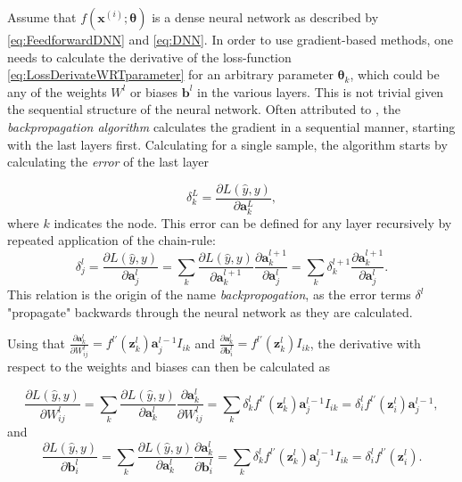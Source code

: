 Assume that $f(\boldsymbol{x}^{(i)}; \boldsymbol{\theta})$ is a dense neural network as described by \cref{eq:FeedforwardDNN} and \cref{eq:DNN}. In order to use gradient-based methods, one needs to calculate the derivative of the loss-function \cref{eq:LossDerivateWRTparameter} for an arbitrary parameter $\boldsymbol{\theta}_k$, which could be any of the weights $W^l$ or biases $\boldsymbol{b}^l$ in the various layers. This is not trivial given the sequential structure of the neural network. Often attributed to \citet{Rumelhart}, the \emph{backpropagation algorithm} calculates the gradient in a sequential manner, starting with the last layers first. Calculating for a single sample, the algorithm starts by calculating the \emph{error} of the last layer


\begin{equation}\label{eq:lastLayerError}
    \delta^L_k = \frac{\partial L(\hat{y}, y)}{\partial \boldsymbol{a}^L_k},
\end{equation}
where $k$ indicates the node. This error can be defined for any layer recursively by repeated application of the chain-rule:
\begin{equation}\label{eq:error}
    \delta^l_j = \frac{\partial L(\hat{y}, y)}{\partial \boldsymbol{a}^l_j} 
    = \sum_k \frac{\partial L(\hat{y}, y)}{\partial \boldsymbol{a}^{l+1}_k} \frac{\partial \boldsymbol{a}^{l+1}_k}{\partial \boldsymbol{a}^{l}_j}
    = \sum_k \delta^{l+1}_k \frac{\partial \boldsymbol{a}^{l+1}_k}{\partial \boldsymbol{a}^{l}_j}.
\end{equation}
This relation is the origin of the name \emph{backpropogation}, as the error terms $\delta^l$ "propagate" backwards through the neural network as they are calculated.

Using that 
$\frac{\partial \boldsymbol{a}^{l}_k}{\partial W^l_{ij}} = f^{l\prime}(\boldsymbol{z}^{l}_k)\boldsymbol{a}^{l-1}_j I_{ik}$ 
and 
$\frac{\partial \boldsymbol{a}^{l}_k}{\partial \boldsymbol{b}^l_{i}} = f^{l\prime}(\boldsymbol{z}^{l}_k) I_{ik}$, the derivative with respect to the weights and biases can then be calculated as 

\begin{equation}\label{eq:derivweights}
    \frac{\partial L(\hat{y}, y)}{\partial W^l_{ij}} = 
    \sum_k \frac{\partial L(\hat{y}, y)}{\partial \boldsymbol{a}^{l}_k} \frac{\partial \boldsymbol{a}^{l}_k}{\partial W^l_{ij}} = 
    \sum_k \delta^{l}_k f^{l\prime}(\boldsymbol{z}^{l}_k)\boldsymbol{a}^{l-1}_j I_{ik}=
    \delta^{l}_i f^{l\prime}(\boldsymbol{z}^l_i) \boldsymbol{a}^{l-1}_j,
\end{equation}
and
\begin{equation}\label{eq:derivbiases}
    \frac{\partial L(\hat{y}, y)}{\partial \boldsymbol{b}^l_{i}} = 
    \sum_k \frac{\partial L(\hat{y}, y)}{\partial \boldsymbol{a}^{l}_k} \frac{\partial \boldsymbol{a}^{l}_k}{\partial \boldsymbol{b}^l_{i}} = 
    \sum_k \delta^{l}_k f^{l\prime}(\boldsymbol{z}^{l}_k)\boldsymbol{a}^{l-1}_j I_{ik}=
    \delta^{l}_i f^{l\prime}(\boldsymbol{z}^l_i).
\end{equation}

